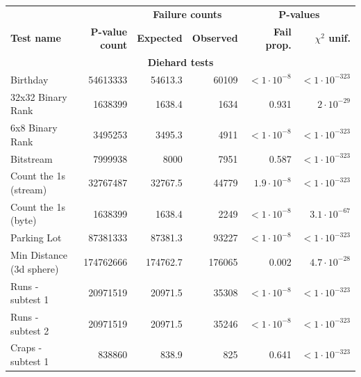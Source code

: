 \documentclass[
  digital,  	%
  color,		%
  oneside,   	%
  12pt,
  nocover,
  notable,
  nolof,
  nolot,
]{fithesis3}
\newcommand{\rd}{\cellcolor{red!40}}
\theoremstyle{definition}
\theoremstyle{remark}
\begin{document}
\begin{table}
\begin{nomar}
\centering
\scalebox{.85}
{
\begin{tabular}{@{}lrrrrr@{}} \toprule
                               &                   & \multicolumn{2}{c}{\textbf{Failure counts}} & \multicolumn{2}{c}{\textbf{P-values}} \\ \cmidrule(lr){3-4} \cmidrule(lr){5-6}
\textbf{Test name}             & \textbf{P-value count}     & \textbf{Expected}      & \textbf{Observed}      & \textbf{Fail prop.}        & \textbf{$\chi^2$ unif.}      \\ \midrule
\multicolumn{6}{c}{\textbf{Diehard tests}} \\ \midrule
Birthday                       & 54613333          & 54613.3       & 60109         & $<1\cdot 10^{-8}$  \rd & $<1\cdot 10^{-323}$   \rd \\
32x32 Binary Rank              & 1638399           & 1638.4        & 1634          & 0.931                  & $2 \cdot 10^{-29}$    \rd \\
6x8 Binary Rank                & 3495253           & 3495.3        & 4911          & $<1\cdot 10^{-8}$  \rd & $<1\cdot 10^{-323}$   \rd \\
Bitstream                      & 7999938           & 8000          & 7951          & 0.587                  & $<1\cdot 10^{-323}$   \rd \\
Count the 1s (stream)          & 32767487          & 32767.5       & 44779         & $1.9\cdot 10^{-8}$ \rd & $<1\cdot 10^{-323}$   \rd \\
Count the 1s (byte)            & 1638399           & 1638.4        & 2249          & $<1\cdot 10^{-8}$  \rd & $3.1 \cdot 10^{-67}$  \rd \\
Parking Lot                    & 87381333          & 87381.3       & 93227         & $<1\cdot 10^{-8}$  \rd & $<1\cdot 10^{-323}$   \rd \\
Min Distance (3d sphere)       & 174762666         & 174762.7      & 176065        & 0.002                  & $4.7 \cdot 10^{-28}$  \rd \\
Runs - subtest 1               & 20971519          & 20971.5       & 35308         & $<1\cdot 10^{-8}$  \rd & $<1\cdot 10^{-323}$   \rd \\
Runs - subtest 2               & 20971519          & 20971.5       & 35246         & $<1\cdot 10^{-8}$  \rd & $<1\cdot 10^{-323}$   \rd \\
Craps - subtest 1              & 838860            & 838.9         & 825           & 0.641                  & $<1\cdot 10^{-323}$   \rd \\ \midrule

\end{tabular}}
\end{nomar}
\end{table}
\end{document}
